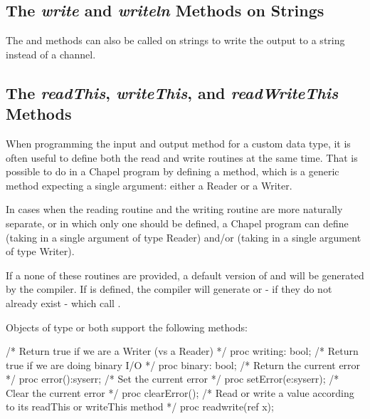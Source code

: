 \subsection{The {\em write} and {\em writeln} Methods on Strings}
\label{stringwrite}

The  and  methods can also be called on
strings to write the output to a string instead of a channel.




\subsection{The {\em readThis}, {\em writeThis}, and {\em readWriteThis} Methods}

When programming the input and output method for a custom data type, it is often useful to define both the read and write routines at the same time. That is possible to do in a Chapel program by defining a  method, which is a generic method expecting a single argument: either a Reader or a Writer.

In cases when the reading routine and the writing routine are more naturally separate, or in which only one should be defined, a Chapel program can define  (taking in a single argument of type Reader) and/or  (taking in a single argument of type Writer). 

If a none of these routines are provided, a default version of  and  will be generated by the compiler. If  is defined, the compiler will generate  or  - if they do not already exist - which call .

Objects of type  or  both support the following methods:
\begin{chapel}
  /* Return true if we are a Writer (vs a Reader) */
  proc writing: bool;
  /* Return true if we are doing binary I/O */
  proc binary: bool;
  /* Return the current error */
  proc error():syserr;
  /* Set the current error */
  proc setError(e:syserr);
  /* Clear the current error */
  proc clearError();
  /* Read or write a value according to its readThis or writeThis method */
  proc readwrite(ref x);
\end{chapel}


